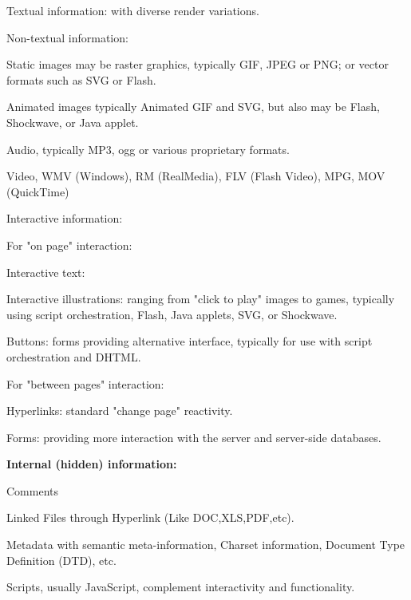 \begin{compactitem}
\item Textual information: with diverse render variations.
\item Non-textual information:
	\begin{compactitem}
	\item Static images may be raster graphics, typically GIF, JPEG or PNG; or vector formats such as SVG or Flash.
	\item Animated images typically Animated GIF and SVG, but also may be Flash, Shockwave, or Java applet.
	\item Audio, typically MP3, ogg or various proprietary formats.
	\item Video, WMV (Windows), RM (RealMedia), FLV (Flash Video), MPG, MOV (QuickTime)
	\end{compactitem}
\item Interactive information:
	\begin{compactitem}
	\item For "on page" interaction:
		\begin{compactitem}
		\item Interactive text: 
		\item Interactive illustrations: ranging from "click to play" images to games, typically using script orchestration, Flash, Java applets, SVG, or Shockwave.
		\item Buttons: forms providing alternative interface, typically for use with script orchestration and DHTML.
		\end{compactitem}
	
	\item For "between pages" interaction:
		\begin{compactitem}
		\item Hyperlinks: standard "change page" reactivity.
		\item Forms: providing more interaction with the server and server-side databases.
		\end{compactitem}
	
	\end{compactitem}

\end{compactitem}





\textbf{Internal (hidden) information:}



\begin{compactitem}
\item Comments
\item Linked Files through Hyperlink (Like DOC,XLS,PDF,etc).
\item Metadata with semantic meta-information, Charset information, Document Type Definition (DTD), etc.
\item Scripts, usually JavaScript, complement interactivity and functionality.
\end{compactitem}

